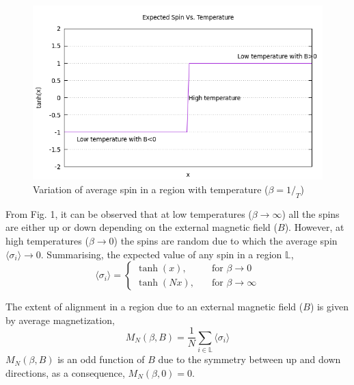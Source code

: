 \documentclass[letterpaper,english,10pt]{article}
\begin{document}
\begin{figure}
\centering
\includegraphics[width=\textwidth]{Figures/tanh.png}
\caption{Variation of average spin in a region with temperature ($\beta = 1/_T$)}
\end{figure}
From Fig. 1, it can be observed that at low temperatures ($\beta \to \infty$) all the spins are either up or down depending on the external magnetic field ($B$). However, at high temperatures ($\beta \to 0$) the spins are random due to which the average spin $\langle \sigma_{i}\rangle \to 0$. Summarising, the expected value of any spin in a region $\mathbb{L}$,	
	\[\langle\sigma_{i}\rangle =
	\begin{cases}
	\tanh(x), & \quad \text{for } \beta \to 0 \\
	\tanh(Nx), & \quad \text{for } \beta \to \infty
	\end{cases}	\]

\begin{defn} The extent of alignment in a region due to an external magnetic field ($B$) is given by average magnetization,
	$$M_{N}(\beta,B)=\frac{1}{N}\sum_{i\in \mathbb{L}}\langle\sigma_{i}\rangle$$
$M_{N}(\beta,B)$ is an odd function of $B$ due to the symmetry between up and down directions, as a consequence, $M_{N}(\beta,0) = 0$. 
\end{defn}
\end{document}
